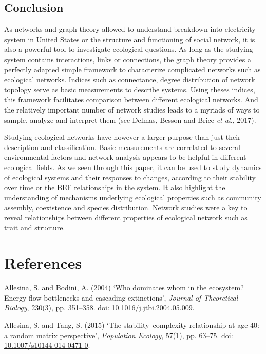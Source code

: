 \documentclass[12pt]{article}
\begin{document}
\subsection{Conclusion}\label{conclusion}

As networks and graph theory allowed to understand breakdown into
electricity system in United States or the structure and functioning of
social network, it is also a powerful tool to investigate ecological
questions. As long as the studying system contains interactions, links
or connections, the graph theory provides a perfectly adapted simple
framework to characterize complicated networks such as ecological
networks. Indices such as connectance, degree distribution of network
topology serve as basic measurements to describe systems. Using theses
indices, this framework facilitates comparison between different
ecological networks. And the relatively important number of network
studies leads to a myriads of ways to sample, analyze and interpret them
(see Delmas, Besson and Brice \emph{et al.}, 2017).

Studying ecological networks have however a larger purpose than just
their description and classification. Basic measurements are correlated
to several environmental factors and network analysis appears to be
helpful in different ecological fields. As we seen through this paper,
it can be used to study dynamics of ecological systems and their
responses to changes, according to their stability over time or the BEF
relationships in the system. It also highlight the understanding of
mechanisms underlying ecological properties such as community assembly,
coexistence and species distribution. Network studies were a key to
reveal relationships between different properties of ecological network
such as trait and structure.

\section*{References}\label{references}

\hypertarget{refs}{}
\hypertarget{ref-alle04wdw}{}
Allesina, S. and Bodini, A. (2004) `Who dominates whom in the ecosystem?
Energy flow bottlenecks and cascading extinctions', \emph{Journal of
Theoretical Biology}, 230(3), pp. 351--358. doi:
\href{https://doi.org/10.1016/j.jtbi.2004.05.009}{10.1016/j.jtbi.2004.05.009}.

\hypertarget{ref-alle15sra}{}
Allesina, S. and Tang, S. (2015) `The stability--complexity relationship
at age 40: a random matrix perspective', \emph{Population Ecology},
57(1), pp. 63--75. doi:
\href{https://doi.org/10.1007/s10144-014-0471-0}{10.1007/s10144-014-0471-0}.
\end{document}
